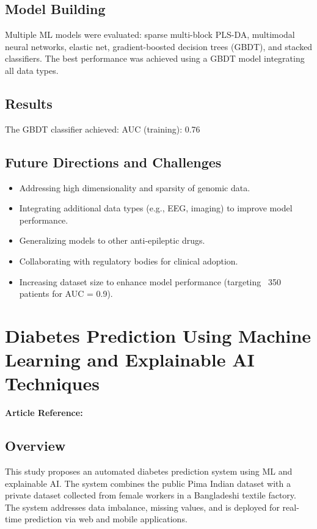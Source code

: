 \subsection*{Model Building}
Multiple ML models were evaluated: sparse multi-block PLS-DA, multimodal neural networks, elastic net, gradient-boosted decision trees (GBDT), and stacked classifiers. The best performance was achieved using a GBDT model integrating all data types.

\subsection*{Results}
The GBDT classifier achieved: AUC (training): 0.76

\subsection*{Future Directions and Challenges}
\begin{itemize}
    \item Addressing high dimensionality and sparsity of genomic data.
    \item Integrating additional data types (e.g., EEG, imaging) to improve model performance.
    \item Generalizing models to other anti-epileptic drugs.
    \item Collaborating with regulatory bodies for clinical adoption.
    \item Increasing dataset size to enhance model performance (targeting ~350 patients for AUC = 0.9).
\end{itemize}

\section{Diabetes Prediction Using Machine Learning and Explainable AI Techniques}
\textbf{Article Reference:} \cite{article_2}

\subsection*{Overview}
This study proposes an automated diabetes prediction system using ML and explainable AI. The system combines the public Pima Indian dataset with a private dataset collected from female workers in a Bangladeshi textile factory. The system addresses data imbalance, missing values, and is deployed for real-time prediction via web and mobile applications.

